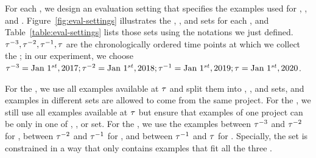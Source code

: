\begin{figure*}[t]
  \centering
  
  \caption{Evaluation settings. \label{fig:eval-settings}}
\end{figure*}


For each \methodology, we design an evaluation setting that specifies
the examples used for \train, \val, and \test.
Figure~\ref{fig:eval-settings} illustrates the \train, \val, and \test
sets for each \methodology, and Table~\ref{table:eval-settings} lists
those sets using the notations we just defined.  $\tau^{-3}, \tau^{-2},
\tau^{-1}, \tau$ are the chronologically ordered time points at which
we collect the ; in our experiment, we choose $\tau^{-3} =
\text{Jan }1^{st}, 2017; \tau^{-2} = \text{Jan }1^{st}, 2018; \tau^{-1} = \text{Jan }1^{st}, 2019;
\tau = \text{Jan }1^{st}, 2020$.

For the \mixedproj \methodology, we use all examples available at
$\tau$ and split them into \train, \val, and \test sets, and
examples in different sets are allowed to come from the same project.
For the \crossproj \methodology, we still use all examples available
at $\tau$ but ensure that examples of one project can be only in one
of \train, \val, or \test set.  For the \evoaware \methodology, we use
the examples between $\tau^{-3}$ and $\tau^{-2}$ for \train, between
$\tau^{-2}$ and $\tau^{-1}$ for \val, and between $\tau^{-1}$ and $\tau$
for \test. Specially, the \test set is constrained in a way that only
contains examples that fit all the three \methodologies.


